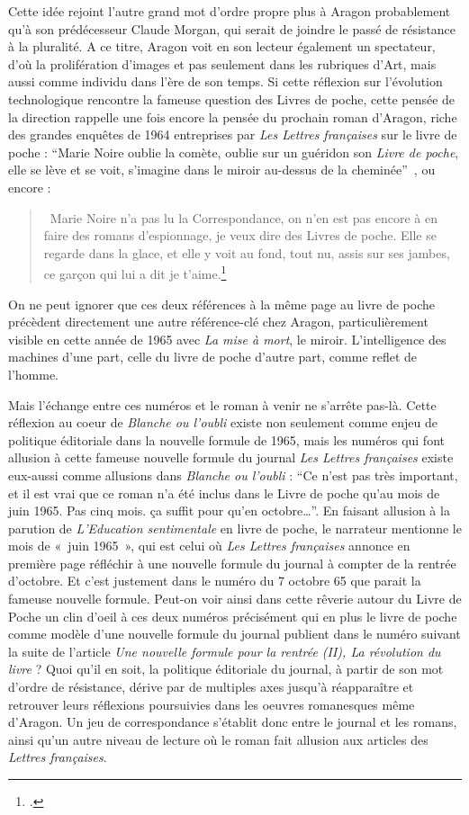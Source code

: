 	Cette idée rejoint l’autre grand mot d’ordre propre plus à Aragon probablement qu’à son prédécesseur Claude Morgan, qui serait de joindre le passé de résistance à la pluralité. A ce titre, Aragon voit en son lecteur également un spectateur, d’où la prolifération d’images et pas seulement dans les rubriques d’Art, mais aussi comme individu dans l’ère de son temps. Si cette réflexion sur l’évolution technologique rencontre la fameuse question des Livres de poche, cette pensée de la direction rappelle une fois encore la pensée du prochain roman d’Aragon, riche des grandes enquêtes de 1964 entreprises par \emph{Les Lettres françaises} sur le livre de poche : \enquote{Marie Noire oublie la comète, oublie sur un guéridon son \emph{Livre de poche}, elle se lève et se voit, s’imagine dans le miroir au-dessus de la cheminée} , ou encore :
	\begin{quote}
	 Marie Noire n’a pas lu la Correspondance, on n’en est pas encore à en faire des romans d’espionnage, je veux dire des Livres de poche. Elle se regarde dans la glace, et elle y voit au fond, tout nu, assis sur ses jambes, ce garçon qui lui a dit je t’aime.\footcite[p102]{blancheouloubli}\end{quote}

	  On ne peut ignorer que ces deux références à la même page au livre de poche précèdent directement une autre référence-clé chez Aragon, particulièrement visible en cette année de 1965 avec \emph{La mise à mort}, le miroir. L’intelligence des machines d’une part, celle du livre de poche d’autre part, comme reflet de l’homme. 


Mais l’échange entre ces numéros et le roman à venir ne s’arrête pas-là. Cette réflexion au coeur de \emph{Blanche ou l’oubli} existe non seulement comme enjeu de politique éditoriale dans la nouvelle formule de 1965, mais les numéros qui font allusion à cette fameuse nouvelle formule du journal \emph{Les Lettres françaises} existe eux-aussi comme allusions dans \emph{Blanche ou l’oubli} : \enquote{Ce n’est pas très important, et il est vrai que ce roman n’a été inclus dans le Livre de poche qu’au mois de juin 1965. Pas cinq mois. ça suffit pour qu’en octobre…}. En faisant allusion à la parution de \emph{L’Education sentimentale} en livre de poche, le narrateur mentionne le mois de « juin 1965 », qui est celui où \emph{Les Lettres françaises} annonce en première page réfléchir à une nouvelle formule du journal à compter de la rentrée d’octobre. Et c’est justement dans le numéro du 7 octobre 65 que parait la fameuse nouvelle formule. Peut-on voir ainsi dans cette rêverie autour du Livre de Poche un clin d’oeil à ces deux numéros précisément qui en plus le livre de poche comme modèle d’une nouvelle formule du journal publient dans le numéro suivant la suite de l’article \emph{Une nouvelle formule pour la rentrée (II), La révolution du livre }? Quoi qu’il en soit, la politique éditoriale du journal, à partir de son mot d’ordre de résistance, dérive par de multiples axes jusqu’à réapparaître et retrouver leurs réflexions poursuivies dans les oeuvres romanesques même d’Aragon. Un jeu de correspondance s’établit donc entre le journal et les romans, ainsi qu’un autre niveau de lecture où le roman fait allusion aux articles des \emph{Lettres françaises}. 


